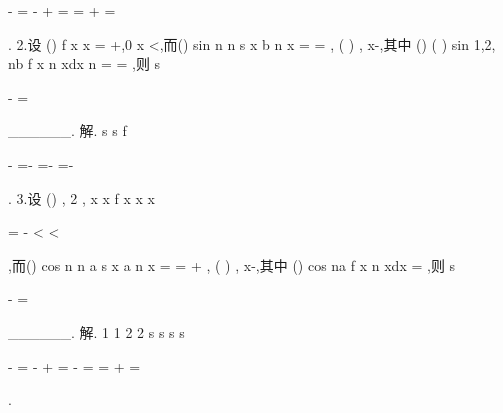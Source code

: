 -
=
-
+
=
=
+
=
















. 
2.设
()
f x
x
=
+,0
x
\le 
<,而()
sin
n
n
s x
b
n x
\pi 
\infty 
=
=\sum 
,
(
)
,
x\in -\infty \infty ,其中 
()
(
)
sin
1,2,
nb
f x
n xdx n
\pi 
=
=
\int 
\Lambda ,则
s

-
=




______. 
解.
s
s
f






-
=-
=-
=-












. 
3.设
()
,
2 ,
x
x
f x
x
x

\le 
\le 

=
-
<
<

,而()
cos
n
n
a
s x
a
n x
\pi 
\infty 
=
=
+\sum 
,
(
)
,
x\in -\infty \infty ,其中 
()
cos
na
f x
n xdx
\pi 
=\int 
,则
s

-
=




______. 
解.
1 1
2 2
s
s
s
s










-
=
-
+
=
-
=
=
+
=




















. 